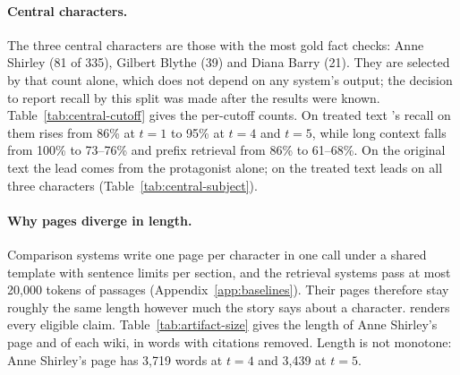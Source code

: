 \paragraph{Central characters.}
The three central characters are those with the most gold fact checks: Anne Shirley (81
of 335), Gilbert Blythe (39) and Diana Barry (21). They are selected by that count alone,
which does not depend on any system's output; the decision to report recall by this
split was made after the results were known. Table~\ref{tab:central-cutoff} gives the per-cutoff
counts. On treated text \sys's recall on them rises from 86\% at $t=1$ to 95\% at $t=4$
and $t=5$, while long context falls from 100\% to 73--76\% and prefix retrieval from 86\%
to 61--68\%. On the original text the lead comes from the protagonist alone; on the
treated text \sys leads on all three characters (Table~\ref{tab:central-subject}).



\paragraph{Why pages diverge in length.}
Comparison systems write one page per character in one call under a shared template with
sentence limits per section, and the retrieval systems pass at most 20,000 tokens of
passages (Appendix~\ref{app:baselines}). Their pages therefore stay roughly the same length
however much the story says about a character. \sys renders every eligible claim.
Table~\ref{tab:artifact-size} gives the length of Anne Shirley's page and of each wiki,
in words with citations removed. Length is not monotone: Anne Shirley's \sys page has
3,719 words at $t=4$ and 3,439 at $t=5$.

